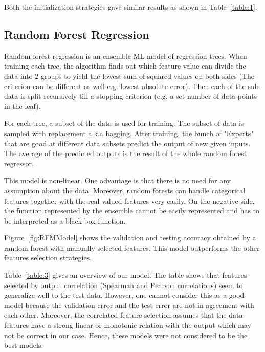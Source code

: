 \documentclass[11pt]{article}
\begin{document}
Both the initialization strategies gave similar results as shown in Table~\ref{table:1}.

\subsection{Random Forest Regression}
\label{RandomForestRegressionLabel}
Random forest regression is an ensemble ML model of regression trees.
When training each tree,  the algorithm finds out which feature value can divide the data into 2 groups to yield the lowest sum of squared values on both sides (The criterion can be different as well e.g. lowest absolute error).
Then each of the sub-data is split recursively till a stopping criterion (e.g. a set number of data points in the leaf).

For each tree,  a subset of the data is used for training. 
The subset of data is sampled with replacement a.k.a bagging.
After training,  the bunch of "Experts" that are good at different data subsets predict the output of new given inputs.
The average of the predicted outputs is the result of the whole random forest regressor.

This model is non-linear.
One advantage is that there is no need for any assumption about the data.
Moreover,  random forests can handle categorical features together with the real-valued features very easily.
On the negative side,  the function represented by the ensemble cannot be easily represented and has to be interpreted as a black-box function.

Figure~\ref{fig:RFMModel} shows the validation and testing accuracy obtained by a random forest with manually selected features.
This model outperforms the other features selection strategies.

Table~\ref{table:3} gives an overview of our model.
The table shows that features selected by output correlation (Spearman and Pearson correlations) seem to generalize well to the test data.
However,  one cannot consider this as a good model because the validation error and the test error are not in agreement with each other.
Moreover,  the correlated feature selection assumes that the data features have a strong linear or monotonic relation with the output which may not be correct in our case. Hence, these models were not considered to be the best models.
\end{document}
